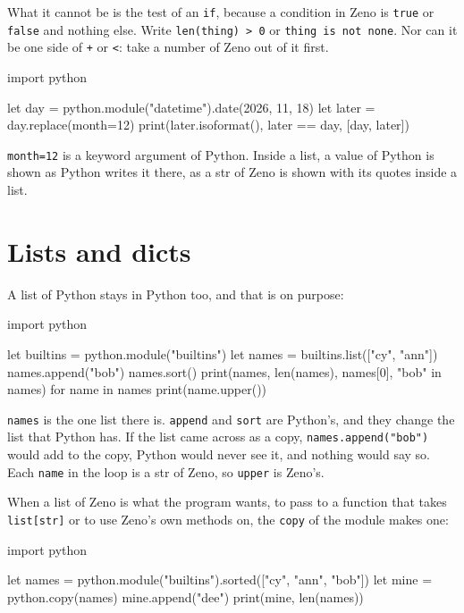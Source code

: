 What it cannot be is the test of an \verb|if|, because a condition in
Zeno is \verb|true| or \verb|false| and nothing else. Write
\verb|len(thing) > 0| or \verb|thing is not none|. Nor can it be one
side of \verb|+| or \verb|<|: take a number of Zeno out of it first.

\begin{zeno}[file=later.zeno, dir=python]
import python

let day = python.module("datetime").date(2026, 11, 18)
let later = day.replace(month=12)
print(later.isoformat(), later == day, [day, later])
\end{zeno}

\verb|month=12| is a keyword argument of Python. Inside a list, a value
of Python is shown as Python writes it there, as a str of Zeno is shown
with its quotes inside a list.

\section{Lists and dicts}

A list of Python stays in Python too, and that is on purpose:

\begin{zeno}[file=names.zeno, dir=python]
import python

let builtins = python.module("builtins")
let names = builtins.list(["cy", "ann"])
names.append("bob")
names.sort()
print(names, len(names), names[0], "bob" in names)
for name in names {
    print(name.upper())
}
\end{zeno}

\verb|names| is the one list there is. \verb|append| and \verb|sort|
are Python's, and they change the list that Python has. If the list
came across as a copy, \verb|names.append("bob")| would add to the
copy, Python would never see it, and nothing would say so. Each
\verb|name| in the loop is a str of Zeno, so \verb|upper| is Zeno's.

When a list of Zeno is what the program wants, to pass to a function
that takes \verb|list[str]| or to use Zeno's own methods on, the
\verb|copy| of the module makes one:

\begin{zeno}[file=mine.zeno, dir=python]
import python

let names = python.module("builtins").sorted(["cy", "ann", "bob"])
let mine = python.copy(names)
mine.append("dee")
print(mine, len(names))
\end{zeno}

